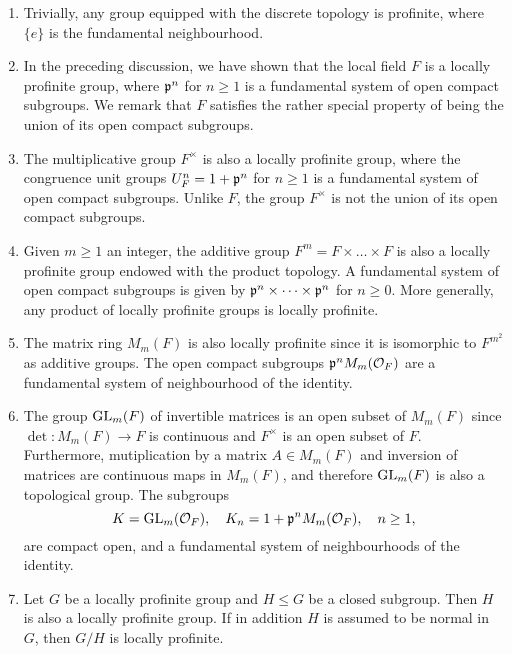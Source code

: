 \begin{examples} \label{example_prof_groups}

    \begin{enumerate}[(1)]
        \item Trivially, any group equipped with the discrete topology is profinite, where $\{e\}$ is the fundamental neighbourhood.
        \item In the preceding discussion, we have shown that the local field $F$ is a locally profinite group, where $\mathfrak{p}^n$ for $n\geq1$ is a fundamental system of open compact subgroups. We remark that $F$ satisfies the rather special property of being the union of its open compact subgroups. %
        \item The multiplicative group $F^{\times}$ is also a locally profinite group, where the congruence unit groups $U_F^n=1+\mathfrak{p}^{n}$ for $n\geq1$ is a fundamental system of open compact subgroups. Unlike $F$, the group $F^{\times}$ is not the union of its open compact subgroups.
        \item Given $m\geq1$ an integer, the additive group $F^m=F\times\dots\times F$ is also a locally profinite group endowed with the product topology. A fundamental system of open compact subgroups is given by $\mathfrak{p}^{n}\times\dots\times\mathfrak{p}^{n}$ for $n\geq0$. More generally, any product of locally profinite groups is locally profinite.
        \item The matrix ring $M_m(F)$ is also locally profinite since it is isomorphic to $F^{m^2}$ as additive groups. The open compact subgroups $\mathfrak{p}^n M_m(\mathcal{O}_F)$ are a fundamental system of neighbourhood of the identity.
        \item The group $\mathrm{GL}_m(F)$ of invertible matrices is an open subset of $M_m(F)$ since $\det:M_m(F)\rightarrow F$ is continuous and $F^{\times}$ is an open subset of $F$. Furthermore, mutiplication by a matrix $A\in M_m(F)$ and inversion of matrices are continuous maps in $M_m(F)$, and therefore $\mathrm{GL}_m(F)$ is also a topological group. The subgroups
        $$K=\mathrm{GL}_m(\mathcal{O}_F),\quad K_n=1+\mathfrak{p}^{n}M_m(\mathcal{O}_F),\quad n\geq 1,$$
        are compact open, and a fundamental system of neighbourhoods of the identity.
        \item Let $G$ be a locally profinite group and $H\leq G$ be a closed subgroup. Then $H$ is also a locally profinite group. If in addition $H$ is assumed to be normal in $G$, then $G/H$ is locally profinite. 
        
    \end{enumerate}
\end{examples}

